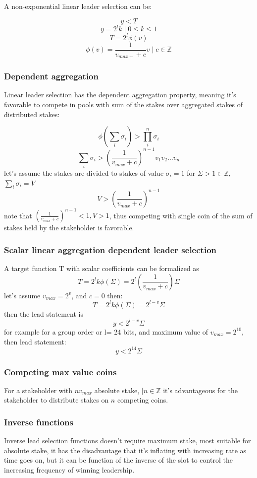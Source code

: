 \documentclass[a4paper]{article}
\begin{document}
A non-exponential  linear leader selection can be:

$$y < T $$ $$y = 2^lk \mid 0 \le k \le 1$$ $$T = 2^l\phi(v)$$ $$
\phi(v)=\frac{1}{v_{max+}+c}v  \mid c \in \mathbb{Z}$$

\subsubsection{ Dependent aggregation}

Linear leader selection has the dependent aggregation property, meaning
it's favorable to compete in pools with sum of the stakes over aggregated
stakes of distributed stakes:

$$\phi(\sum_{i}{\sigma_i})>\prod_{i}^{n}{\sigma_i}$$
$$\sum_{i}{\sigma_i}>(\frac{1}{v_{max}+c})^{n-1}v_1v_2 \dots
v_n$$ let's assume the stakes are divided to stakes of value
$\sigma_i=1$ for $\Sigma>1 \in \mathbb{Z}$, $\sum_{i}{\sigma_i}=V$
$$V>(\frac{1}{v_{max}+c})^{n-1}$$ note that $(\frac{1}{v_{max}+c})^{n-1}
< 1, V>1$, thus competing with single coin of the sum of stakes held by
the stakeholder is favorable.

\subsubsection{ Scalar linear aggregation dependent leader selection}

A target function T with scalar coefficients can be formalized as
$$T=2^lk\phi(\Sigma)=2^l(\frac{1}{v_{max}+c})\Sigma$$ let's assume
$v_{max}=2^v$, and $c=0$ then: $$T=2^lk\phi(\Sigma)=2^{l-v}\Sigma$$
then the lead statement is $$y<2^{l-v}\Sigma$$ for example for a group
order or l=    24 bits, and maximum value of $v_{max}=2^{10}$, then
lead statement: $$y<2^{14}\Sigma$$

\subsubsection{ Competing max value coins}

For a stakeholder with $nv_{max}$ absolute stake, $\mid n \in \mathbb{Z}$
it's advantageous for the stakeholder to distribute stakes on $n$
competing coins.

\subsubsection{ Inverse functions}

Inverse lead selection functions doesn't require maximum stake, most
suitable for absolute stake, it has the disadvantage that it's inflating
with increasing rate as time goes on, but it can be function of the
inverse of the slot to control the increasing frequency of winning
leadership.
\end{document}
